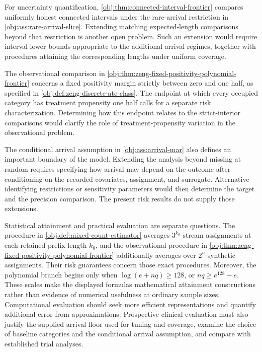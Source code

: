 \documentclass[11pt]{article}
\begin{document}
For uncertainty quantification, \cref{obj:thm:connected-interval-frontier} compares uniformly honest connected intervals under the rare-arrival restriction in \cref{obj:ass:rare-arrival-slice}. Extending matching expected-length comparisons beyond that restriction is another open problem. Such an extension would require interval lower bounds appropriate to the additional arrival regimes, together with procedures attaining the corresponding lengths under uniform coverage.

The observational comparison in \cref{obj:thm:zeng-fixed-positivity-polynomial-frontier} concerns a fixed positivity margin strictly between zero and one half, as specified in \cref{obj:def:zeng-discrete-ate-class}. The endpoint at which every occupied category has treatment propensity one half calls for a separate risk characterization. Determining how this endpoint relates to the strict-interior comparisons would clarify the role of treatment-propensity variation in the observational problem.

The conditional arrival assumption in \cref{obj:ass:arrival-mar} also defines an important boundary of the model. Extending the analysis beyond missing at random requires specifying how arrival may depend on the outcome after conditioning on the recorded covariates, assignment, and surrogate. Alternative identifying restrictions or sensitivity parameters would then determine the target and the precision comparison. The present risk results do not supply those extensions.

Statistical attainment and practical evaluation are separate questions. The procedure in \cref{obj:def:mixed-count-estimator} averages \(3^{k_0}\) stream assignments at each retained prefix length \(k_0\), and the observational procedure in \cref{obj:thm:zeng-fixed-positivity-polynomial-frontier} additionally averages over \(2^n\) synthetic assignments. Their risk guarantees concern those exact procedures. Moreover, the polynomial branch begins only when \(\log(e+nq)\ge128\), or \(nq\ge e^{128}-e\). These scales make the displayed formulas mathematical attainment constructions rather than evidence of numerical usefulness at ordinary sample sizes. Computational evaluation should seek more efficient representations and quantify additional error from approximations. Prospective clinical evaluation must also justify the supplied arrival floor used for tuning and coverage, examine the choice of baseline categories and the conditional arrival assumption, and compare with established trial analyses.
\end{document}
